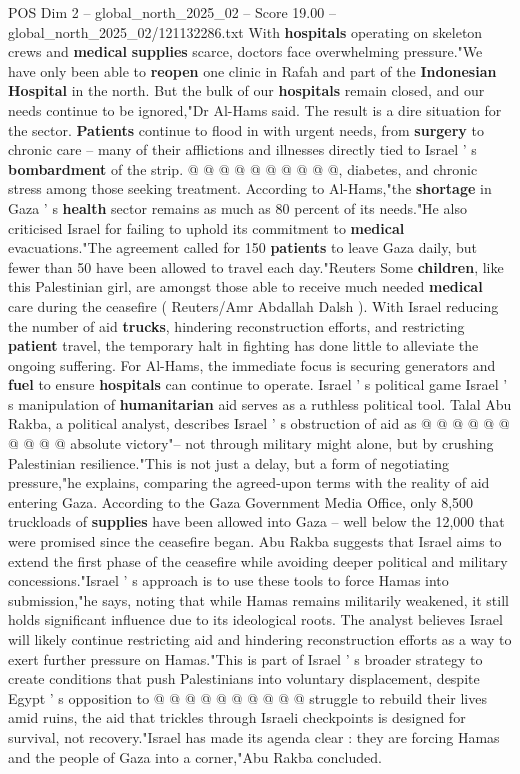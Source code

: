 \begin{textsample}{POS Dim 2 – global\_north\_2025\_02 – Score 19.00 – global\_north\_2025\_02/121132286.txt}
With \textbf{hospitals} operating on skeleton crews and \textbf{medical} \textbf{supplies} scarce, doctors face overwhelming pressure."We have only been able to \textbf{reopen} one clinic in Rafah and part of the \textbf{Indonesian} \textbf{Hospital} in the north.
But the bulk of our \textbf{hospitals} remain closed, and our needs continue to be ignored,"Dr Al-Hams said.
The result is a dire situation for the sector. \textbf{Patients} continue to flood in with urgent needs, from \textbf{surgery} to chronic care -- many of their afflictions and illnesses directly tied to Israel ' s \textbf{bombardment} of the strip. @ @ @ @ @ @ @ @ @ @, diabetes, and chronic stress among those seeking treatment.
According to Al-Hams,"the \textbf{shortage} in Gaza ' s \textbf{health} sector remains as much as 80 percent of its needs."He also criticised Israel for failing to uphold its commitment to \textbf{medical} evacuations."The agreement called for 150 \textbf{patients} to leave Gaza daily, but fewer than 50 have been allowed to travel each day."Reuters Some \textbf{children}, like this Palestinian girl, are amongst those able to receive much needed \textbf{medical} care during the ceasefire ( Reuters/Amr Abdallah Dalsh ).
With Israel reducing the number of aid \textbf{trucks}, hindering reconstruction efforts, and restricting \textbf{patient} travel, the temporary halt in fighting has done little to alleviate the ongoing suffering.
For Al-Hams, the immediate focus is securing generators and \textbf{fuel} to ensure \textbf{hospitals} can continue to operate.
Israel ' s political game Israel ' s manipulation of \textbf{humanitarian} aid serves as a ruthless political tool.
Talal Abu Rakba, a political analyst, describes Israel ' s obstruction of aid as @ @ @ @ @ @ @ @ @ @ absolute victory"-- not through military might alone, but by crushing Palestinian resilience."This is not just a delay, but a form of negotiating pressure,"he explains, comparing the agreed-upon terms with the reality of aid entering Gaza.
According to the Gaza Government Media Office, only 8,500 truckloads of \textbf{supplies} have been allowed into Gaza -- well below the 12,000 that were promised since the ceasefire began.
Abu Rakba suggests that Israel aims to extend the first phase of the ceasefire while avoiding deeper political and military concessions."Israel ' s approach is to use these tools to force Hamas into submission,"he says, noting that while Hamas remains militarily weakened, it still holds significant influence due to its ideological roots.
The analyst believes Israel will likely continue restricting aid and hindering reconstruction efforts as a way to exert further pressure on Hamas."This is part of Israel ' s broader strategy to create conditions that push Palestinians into voluntary displacement, despite Egypt ' s opposition to @ @ @ @ @ @ @ @ @ @ struggle to rebuild their lives amid ruins, the aid that trickles through Israeli checkpoints is designed for survival, not recovery."Israel has made its agenda clear : they are forcing Hamas and the people of Gaza into a corner,"Abu Rakba concluded.

\end{textsample}
